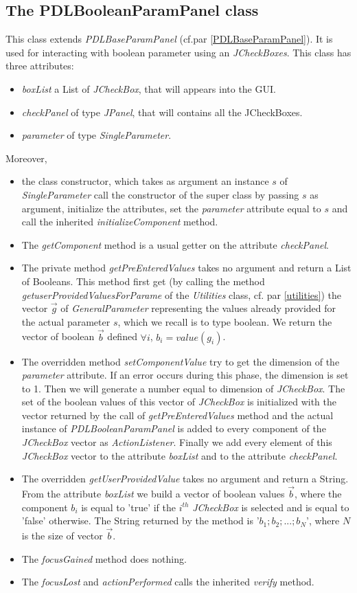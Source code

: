 \documentclass[a4paper,11pt] {ivoa}
\begin{document}
\subsection{The PDLBooleanParamPanel class}\label{PDLBooleanParamPanel}
This class extends {\it PDLBaseParamPanel} (cf.par \ref{PDLBaseParamPanel}). It is used for interacting with boolean parameter using an  {\it JCheckBoxes}. This class has three attributes:
\begin{itemize}
\item {\it boxList} a List of {\it JCheckBox}, that will appears into the GUI.
\item {\it checkPanel} of type  {\it JPanel}, that will contains all the JCheckBoxes.
\item {\it parameter} of type {\it SingleParameter}.
\end{itemize}
Moreover, 
\begin{itemize}
\item the class constructor, which takes as argument an instance $s$ of {\it SingleParameter} call the constructor of the super class by passing $s$ as argument, initialize the attributes, set the {\it parameter} attribute equal to $s$ and call the inherited  {\it initializeComponent} method.
\item The {\it getComponent} method is a usual getter on the attribute {\it checkPanel}.
\item The private method {\it getPreEnteredValues} takes no argument and return a List of Booleans. This method first get (by calling the method {\it getuserProvidedValuesForParame} of the {\it Utilities} class, cf. par \ref{utilities}) the vector $\vec g$ of {\it GeneralParameter} representing the values already provided for the actual parameter $s$, which we recall is to type boolean. We return the vector of boolean $\vec b$ defined $\forall i$, $b_i = value(g_i)$. 
\item The overridden method {\it setComponentValue} try to get the dimension of the {\it parameter} attribute. If an error occurs during this phase, the dimension is set to 1. Then we will generate a number equal to dimension of {\it JCheckBox}. The set of the boolean values of this vector of {\it JCheckBox} is initialized with the vector returned by the call of {\it getPreEnteredValues} method and the actual instance of {\it PDLBooleanParamPanel} is added to every component of the {\it JCheckBox} vector  as {\it ActionListener}. Finally we add every element of this {\it JCheckBox} vector to the attribute {\it boxList} and to the attribute {\it checkPanel}.
\item The overridden {\it getUserProvidedValue} takes no argument and return a String. From the attribute {\it boxList} we build a vector of boolean values $\vec b$, where the component $b_i$ is equal to 'true' if the $i^{th} $ {\it JCheckBox} is selected and is equal to 'false' otherwise. The String returned by the method is '$b_1;b_2;...;b_N$', where $N$ is the size of vector $\vec b$.
\item The {\it focusGained} method does nothing.
\item The {\it focusLost} and {\it actionPerformed} calls the inherited {\it verify} method.
\end{itemize}
\end{document}
